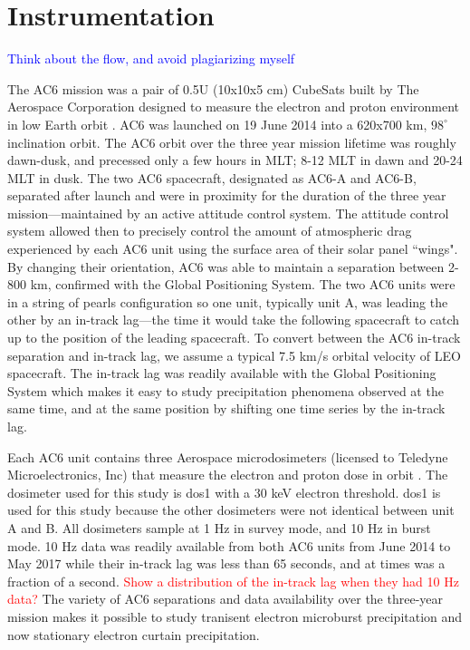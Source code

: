 \documentclass[draft]{agujournal2019}
\begin{document}
\section{Instrumentation} \label{instrumentation}
\textcolor{blue}{Think about the flow, and avoid plagiarizing myself}

The AC6 mission was a pair of 0.5U (10x10x5 cm) CubeSats built by The Aerospace Corporation designed to measure the electron and proton environment in low Earth orbit \cite{O'brien2016}. AC6 was launched on 19 June 2014 into a 620x700 km, $98^\circ$ inclination orbit. The AC6 orbit over the three year mission lifetime was roughly dawn-dusk, and precessed only a few hours in MLT; 8-12 MLT in dawn and 20-24 MLT in dusk. The two AC6 spacecraft, designated as AC6-A and AC6-B, separated after launch and were in proximity for the duration of the three year mission---maintained by an active attitude control system. The attitude control system allowed then to precisely control the amount of atmospheric drag experienced by each AC6 unit using the surface area of their solar panel ``wings". By changing their orientation, AC6 was able to maintain a separation between 2-800 km, confirmed with the Global Positioning System. The two AC6 units were in a string of pearls configuration so one unit, typically unit A, was leading the other by an in-track lag---the time it would take the following spacecraft to catch up to the position of the leading spacecraft. To convert between the AC6 in-track separation and in-track lag, we assume a typical 7.5 km/s orbital velocity of LEO spacecraft. The in-track lag was readily available with the Global Positioning System which makes it easy to study precipitation phenomena observed at the same time, and at the same position by shifting one time series by the in-track lag.

Each AC6 unit contains three Aerospace microdosimeters (licensed to Teledyne Microelectronics, Inc) that measure the electron and proton dose in orbit \cite{O'brien2016}. The dosimeter used for this study is dos1 with a $30$ keV electron threshold. dos1 is used for this study because the other dosimeters were not identical between unit A and B. All dosimeters sample at 1 Hz in survey mode, and 10 Hz in burst mode. 10 Hz data was readily available from both AC6 units from June 2014 to May 2017 while their in-track lag was less than 65 seconds, and at times was a fraction of a second. \textcolor{red}{Show a distribution of the in-track lag when they had 10 Hz data?} The variety of AC6 separations and data availability over the three-year mission makes it possible to study tranisent electron microburst precipitation \cite{Shumko2019} and now stationary electron curtain precipitation.
\end{document}
